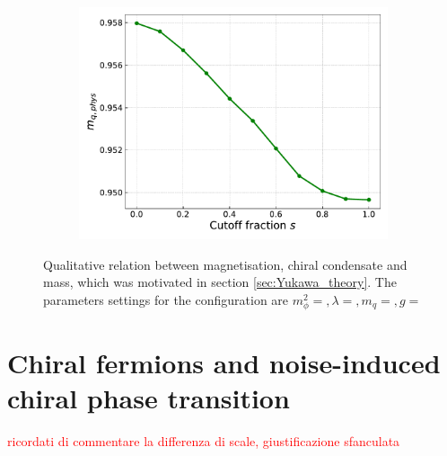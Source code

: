\begin{figure}
\begin{subfigure}[b]{0.48\textwidth}
        \includegraphics[width=1.0\textwidth]{figures/slide_broken/mass.pdf}
    \end{subfigure}
    \caption[Relation between magnetisation, condensate and mass]{Qualitative relation between magnetisation, chiral condensate and mass, which was motivated in section \ref{sec:Yukawa_theory}. The parameters settings for the configuration are $m_\phi^2=, \lambda=, m_q=, g=$}
    \label{fig:interpolation_relation_phi_cond_mass}
\end{figure}
\newpage


\section{Chiral fermions and noise-induced chiral phase transition}
\label{sec:chiral_PT}
\textcolor{red}{ricordati di commentare la differenza di scale, giustificazione sfanculata}

